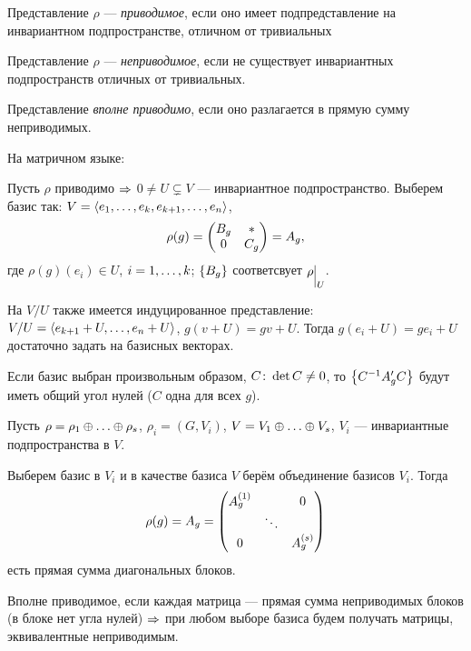 \begin{df}
	Представление $\rho$ --- \textit{приводимое}, если оно имеет
	подпредставление на инвариантном подпространстве,
	отличном от тривиальных
\end{df}
\begin{df}
	Представление $\rho$ --- \textit{неприводимое}, если не существует
	инвариантных подпространств отличных от тривиальных.
\end{df}
\begin{df}
	Представление \textit{вполне приводимо}, если оно разлагается в прямую сумму неприводимых.
\end{df}

На матричном языке:

Пусть $\rho$ приводимо $\Rightarrow$
$0 \ne U \subsetneq V$ --- инвариантное подпространство.
Выберем базис так: $V = \left\langle e_1 ,\ldots, e_k, e_{k + 1} ,\ldots, e_n\right\rangle$,
$$
	\rho(g) = \begin{pmatrix}B_g & * \\ 0 & C_g\end{pmatrix} = A_g,
$$
где $\rho(g)(e_i) \in U$, $i = 1 ,\ldots, k$;
$\left\{B_g\right\}$ соответсвует $\rho\evn{U}$.

На $V/U$ также имеется индуцированное представление:
$V/U = \left\langle e_{k+1} + U ,\ldots, e_n + U\right\rangle$, $g(v + U) = gv + U$.
Тогда $g(e_i + U) = g e_i + U$ достаточно задать на базисных векторах.

Если базис выбран произвольным образом, $C \colon \det C \ne 0$,
то $\left\{C^{-1} A'_g C\right\}$ будут иметь общий угол нулей ($C$ одна для всех $g$).

Пусть $\rho = \rho_1 \sop \rho_s$, $\rho_i = (G, V_i)$, $V = V_1 \sop V_s$,
$V_i$ --- инвариантные подпространства в $V$.

Выберем базис в $V_i$ и в качестве базиса $V$ берём объединение базисов $V_i$.
Тогда
$$
	\rho(g) = A_g = \begin{pmatrix}A^{(1)}_g && 0 \\ & \ddots & \\ 0 && A^{(s)}_g\end{pmatrix}
$$
есть прямая сумма диагональных блоков.

Вполне приводимое, если каждая матрица ---
прямая сумма неприводимых блоков (в блоке нет угла нулей) $\Rightarrow$
при любом выборе базиса будем получать матрицы, эквивалентные неприводимым.

